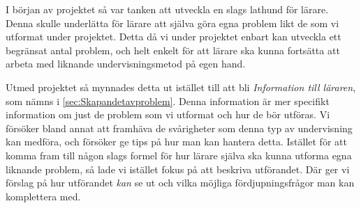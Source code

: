 \textcolor{Mahogany}{I början av projektet så var tanken att utveckla en slags lathund för lärare. Denna skulle underlätta för lärare att själva göra egna problem likt de som vi utformat under projektet. Detta då vi under projektet enbart kan utveckla ett begränsat antal problem, och helt enkelt för att lärare ska kunna fortsätta att arbeta med liknande undervisningsmetod på egen hand.}

\textcolor{Mahogany}{Utmed projektet så mynnades detta ut istället till att bli \textsl{Information till läraren}, som nämns i \ref{sec:Skapandetavproblem}. Denna information är mer specifikt information om just de problem som vi utformat och hur de bör utföras. Vi försöker bland annat att framhäva de svårigheter som denna typ av undervisning kan medföra, och försöker ge tips på hur man kan hantera detta. Istället för att komma fram till någon slags formel för hur lärare själva ska kunna utforma egna liknande problem, så lade vi istället fokus på att beskriva utförandet. Där ger vi förslag på hur utförandet \textsl{kan} se ut och vilka möjliga fördjupningsfrågor man kan komplettera med.}
